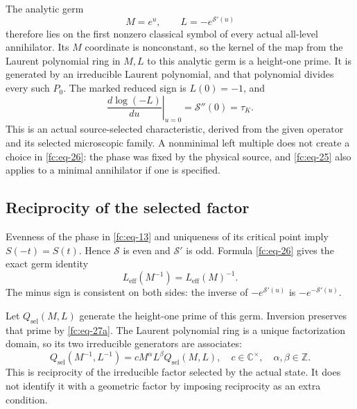 The analytic germ
\begin{equation}\label{fc:eq-26}
M=e^u,\qquad L=-e^{\mathcal S'(u)}
\end{equation}
 therefore lies on the first nonzero classical symbol of every actual all-level annihilator. Its \(M\) coordinate is nonconstant, so the kernel of the map from the Laurent polynomial ring in \(M,L\) to this analytic germ is a height-one prime. It is generated by an irreducible Laurent polynomial, and that polynomial divides every such \(P_0\). The marked reduced sign is \(L(0)=-1\), and
\begin{equation}\label{fc:eq-27}
\left.\frac{d\log(-L)}{du}\right|_{u=0}
                 =\mathcal S''(0)=\tau_K.
\end{equation}
 This is an actual source-selected characteristic, derived from the given operator and its selected microscopic family. A nonminimal left multiple does not create a choice in \eqref{fc:eq-26}: the phase was fixed by the physical source, and \eqref{fc:eq-25} also applies to a minimal annihilator if one is specified.

\subsection{Reciprocity of the selected factor}\label{fc:sec-6-1}

Evenness of the phase in \eqref{fc:eq-13} and uniqueness of its critical point imply \(S(-t)=S(t)\). Hence \(\mathcal S\) is even and \(\mathcal S'\) is odd. Formula \eqref{fc:eq-26} gives the exact germ identity
\begin{equation}\label{fc:eq-27a}
L_{\mathrm{eff}}(M^{-1})
                    =L_{\mathrm{eff}}(M)^{-1}.
\end{equation}
 The minus sign is consistent on both sides: the inverse of \(-e^{\mathcal S'(u)}\) is \(-e^{-\mathcal S'(u)}\).

Let \(Q_{\mathrm{sel}}(M,L)\) generate the height-one prime of this germ. Inversion preserves that prime by \eqref{fc:eq-27a}. The Laurent polynomial ring is a unique factorization domain, so its two irreducible generators are associates:
\begin{equation}\label{fc:eq-27b}
Q_{\mathrm{sel}}(M^{-1},L^{-1})
        =cM^\alpha L^\beta Q_{\mathrm{sel}}(M,L),
 \quad c\in\mathbb C^\times,\quad \alpha,\beta\in\mathbb Z.
\end{equation}
 This is reciprocity of the irreducible factor selected by the actual state. It does not identify it with a geometric factor by imposing reciprocity as an extra condition.

